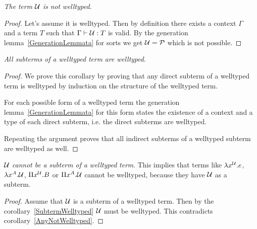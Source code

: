 \begin{corollary}
    \label{AnyNotWelltyped}
    \emph{The term ${\cal U}$ is not welltyped}.

    \begin{proof}
        Let's assume it is welltyped. Then by definition there exists a context
        $\Gamma$ and a term $T$ such that $\Gamma \vdash {\cal U} : T$ is valid. By
        the generation lemma~\ref{GenerationLemmata} for sorts we get ${\cal U} =
        {\cal P}$ which is not possible.
    \end{proof}
\end{corollary}




\begin{corollary}
    \label{SubtermWelltyped}
    \emph{All subterms of a welltyped term are welltyped}.

    \begin{proof}
        We prove this corollary by proving that any direct subterm of a
        welltyped term is welltyped by induction on the structure of the
        welltyped term.

        For each possible form of a welltyped term the generation
        lemma~\ref{GenerationLemmata} for this form states the existence
        of a context and a type of each direct subterm, i.e. the direct subterms
        are welltyped.

        Repeating the argument proves that all indirect subterms of a welltyped
        subterm are welltyped as well.
    \end{proof}
\end{corollary}





\begin{corollary}
    \label{AnyNoSubterm}
    \emph{${\cal U}$ cannot be a subterm of a welltyped term}. This implies that
    terms like $\lambda x^{\cal U}. e$, $\lambda x^A. {\cal U}$, $\Pi x^{\cal U}. B$ or $\Pi
    x^A. {\cal U}$ cannot be welltyped, because they have ${\cal U}$ as a subterm.

    \begin{proof}
        Assume that ${\cal U}$ is a subterm of a welltyped term. Then by the
        corollary~\ref{SubtermWelltyped} ${\cal U}$ must be welltyped. This
        contradicts corollary~\ref{AnyNotWelltyped}.
    \end{proof}
\end{corollary}






